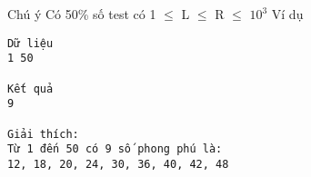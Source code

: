 Chú ý  
Có 50\% số test có 1  $\le$  L  $\le$  R  $\le$  $10^{3}$
   Ví dụ  
\begin{verbatim}
Dữ liệu
1 50

Kết quả
9

Giải thích:
Từ 1 đến 50 có 9 số phong phú là: 
12, 18, 20, 24, 30, 36, 40, 42, 48
\end{verbatim}